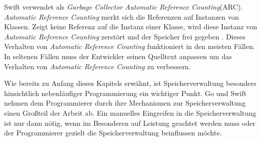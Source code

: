 Swift verwendet als \textit{Garbage Collector} \textit{Automatic Reference Counting}(ARC).
\textit{Automatic Reference Counting} merkt sich die Referenzen auf Instanzen von Klassen.
Zeigt keine Referenz auf die Instanz einer Klasse, wird diese Instanz von \textit{Automatic Reference Counting} zerstört und der Speicher frei gegeben \cite[S.137]{Hoffman.2017}. 
Dieses Verhalten von \textit{Automatic Reference Counting} funktioniert in den meisten Fällen.
In seltenen Fällen muss der Entwickler seinen Quelltext anpassen um das Verhalten von \textit{Automatic Reference Counting} zu verbessern.

Wie bereits zu Anfang dieses Kapitels erwähnt, ist Speicherverwaltung besonders hinsichtlich nebenläufiger Programmierung ein wichtiger Punkt.
Go und Swift nehmen dem Programmierer durch ihre Mechanismen zur Speicherverwaltung einen Großteil der Arbeit ab. 
Ein manuelles Eingreifen in die Speicherverwaltung ist nur dann nötig, wenn im Besonderen auf Leistung geachtet werden muss oder der Programmierer gezielt die Speicherverwaltung beinflussen möchte.

